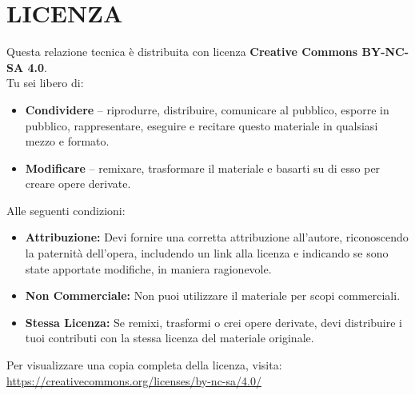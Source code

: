 \documentclass[11pt,a4paper]{article}
\begin{document}



\section{LICENZA}

Questa relazione tecnica è distribuita con licenza \textbf{Creative Commons BY-NC-SA 4.0}.\\
Tu sei libero di:
\begin{itemize}
    \item \textbf{Condividere} -- riprodurre, distribuire, comunicare al pubblico, esporre in pubblico, rappresentare, eseguire e recitare questo materiale in qualsiasi mezzo e formato.
    \item \textbf{Modificare} -- remixare, trasformare il materiale e basarti su di esso per creare opere derivate.
\end{itemize}

Alle seguenti condizioni:
\begin{itemize}
    \item \textbf{Attribuzione:} Devi fornire una corretta attribuzione all’autore, riconoscendo la paternità dell’opera, includendo un link alla licenza e indicando se sono state apportate modifiche, in maniera ragionevole.
    \item \textbf{Non Commerciale:} Non puoi utilizzare il materiale per scopi commerciali.
    \item \textbf{Stessa Licenza:} Se remixi, trasformi o crei opere derivate, devi distribuire i tuoi contributi con la stessa licenza del materiale originale.
\end{itemize}

Per visualizzare una copia completa della licenza, visita: \url{https://creativecommons.org/licenses/by-nc-sa/4.0/}
\end{document}
